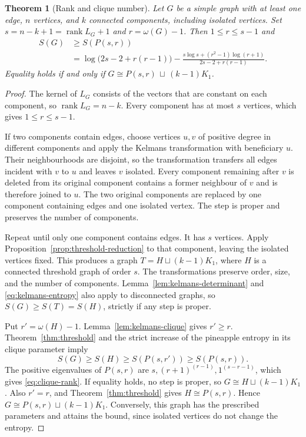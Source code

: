 \documentclass[11pt,a4paper,reqno]{amsart}
\newtheorem{theorem}{Theorem}[section]
\theoremstyle{remark}
\newcommand{\Ent}{S}
\newcommand{\Pine}{P}
\numberwithin{equation}{section}
\begin{document}
\begin{theorem}[Rank and clique number]
\label{thm:clique-rank}
Let $G$ be a simple graph with at least one edge, $n$ vertices, and $k$
connected components, including isolated vertices. Set
$s=n-k+1=\operatorname{rank}L_G+1$ and $r=\omega(G)-1$.
Then $1\le r\le s-1$ and
\begin{equation}\label{eq:clique-rank}
 \begin{aligned}
 \Ent(G)&\ge\Ent(\Pine(s,r))\\
 &=\log\bigl(2s-2+r(r-1)\bigr)
 -\frac{s\log s+(r^2-1)\log(r+1)}{2s-2+r(r-1)}.
 \end{aligned}
\end{equation}
Equality holds if and only if
$G\cong\Pine(s,r)\,\sqcup\,(k-1)K_1$.
\end{theorem}
\begin{proof}
The kernel of $L_G$ consists of the vectors that are constant on each
component, so $\operatorname{rank}L_G=n-k$. Every component has at most
$s$ vertices, which gives $1\le r\le s-1$.

If two components contain edges, choose vertices $u,v$ of positive
degree in different components and apply the Kelmans transformation
with beneficiary $u$. Their neighbourhoods are disjoint, so the
transformation transfers all edges incident with $v$ to $u$ and leaves
$v$ isolated. Every component remaining after $v$ is deleted from its
original component contains a former neighbour of $v$ and is therefore
joined to $u$. The two original
components are replaced by one component containing edges and one
isolated vertex. The step is proper and preserves the number of
components.

Repeat until only one component contains edges. It has $s$ vertices.
Apply Proposition~\ref{prop:threshold-reduction} to that component,
leaving the isolated vertices fixed. This produces a graph
$T=H\sqcup(k-1)K_1$, where $H$ is a connected threshold graph of
order $s$. The transformations preserve order, size, and the number of
components. Lemma~\ref{lem:kelmans-determinant}
and \eqref{eq:kelmans-entropy} also apply to disconnected graphs,
so $\Ent(G)\ge\Ent(T)=\Ent(H)$, strictly if any step is proper.

Put $r'=\omega(H)-1$. Lemma~\ref{lem:kelmans-clique} gives $r'\ge r$.
Theorem~\ref{thm:threshold} and the strict increase of the pineapple
entropy in its clique parameter imply
\[
 \Ent(G)\ge\Ent(H)\ge\Ent(\Pine(s,r'))
 \ge\Ent(\Pine(s,r)).
\]
The positive eigenvalues of $\Pine(s,r)$ are
$s,(r+1)^{(r-1)},1^{(s-r-1)}$, which gives
\eqref{eq:clique-rank}. If equality holds, no step is proper, so
$G\cong H\sqcup(k-1)K_1$. Also $r'=r$, and
Theorem~\ref{thm:threshold} gives
$H\cong\Pine(s,r)$. Hence $G\cong\Pine(s,r)\sqcup(k-1)K_1$.
Conversely, this graph has the prescribed parameters and attains the
bound, since isolated vertices do not change the entropy.
\end{proof}
\end{document}
